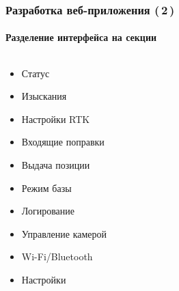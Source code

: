 \documentclass[xetex,с,aspectratio=169]{beamer}
\begin{document}
%
%
\begin{frame}
  \frametitle{Разработка веб-приложения (\,2\,)}
  \framesubtitle{Разделение интерфейса на секции}

  \begin{columns}[T]
    \begin{column}[T]{.32\textwidth}
      \begin{itemize}
        \item<1> Статус
        \item<2> Изыскания
        \item<3> Настройки RTK
        \item<4> Входящие поправки
        \item<5> Выдача позиции
        \item<6> Режим базы
        \item<7> Логирование
        \item<8> Управление камерой
        \item<9> Wi-Fi/Bluetooth
        \item<10> Настройки
      \end{itemize}
    \end{column}
    \hspace{1em}
    \begin{column}{.64\textwidth}
\end{column}
\end{columns}
\end{frame}
\end{document}
